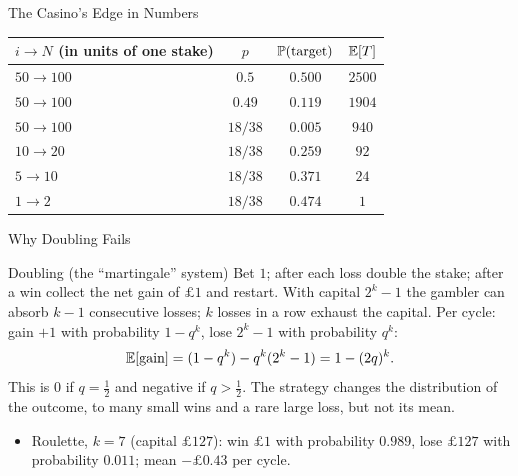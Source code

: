 \begin{frame}{The Casino's Edge in Numbers}
  \label{fr:casino}
  \small
  \begin{center}
      \renewcommand{\arraystretch}{1.25}
      \begin{tabular}{@{}lccc@{}}
        \toprule
        $i\to N$ (in units of one stake) & $p$ & $\mathbb{P}(\text{target})$ & $\mathbb{E}[T]$ \\
        \midrule
        $50\to100$ & $0.5$ & $0.500$ & $2500$ \\
        $50\to100$ & $0.49$ & $0.119$ & $1904$ \\
        $50\to100$ & $18/38$ & $0.005$ & $940$ \\
        $10\to20$ & $18/38$ & $0.259$ & $92$ \\
        $5\to10$ & $18/38$ & $0.371$ & $24$ \\
        $1\to2$ & $18/38$ & $0.474$ & $1$ \\
        \bottomrule
      \end{tabular}
  \end{center}
\end{frame}

\begin{frame}{Why Doubling Fails}
  \label{fr:doubling}
  \small
      \begin{block}{Doubling (the ``martingale'' system)}
        Bet $1$; after each loss double the stake; after a win collect the net gain of $\pounds1$ and restart. With capital $2^k-1$ the gambler can absorb $k-1$ consecutive losses; $k$ losses in a row exhaust the capital.
        Per cycle: gain $+1$ with probability $1-q^k$, lose $2^k-1$ with probability $q^k$:
        \[
          \mathbb{E}[\text{gain}]=(1-q^k)-q^k(2^k-1)=1-(2q)^k .
        \]
        This is $0$ if $q=\tfrac12$ and negative if $q>\tfrac12$. The strategy changes the distribution of the outcome, to many small wins and a rare large loss, but not its mean.
      \end{block}
      \begin{itemize}
        \item Roulette, $k=7$ (capital $\pounds127$): win $\pounds1$ with probability $0.989$, lose $\pounds127$ with probability $0.011$; mean $-\pounds0.43$ per cycle.
      \end{itemize}
\end{frame}

